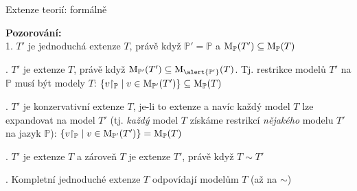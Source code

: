 \documentclass{beamer}
\begin{document}
\begin{frame}{Extenze teorií: formálně}


    \pause
    {\small
    \textbf{Pozorování:}\\
    1. $T'$ je jednoduchá extenze $T$, právě když $\mathbb P'=\mathbb P$ a $\operatorname{M}_\mathbb P(T')\subseteq\operatorname{M}_\mathbb P(T)$

    . $T'$ je extenze $T$, právě když $\M_{\mathbb P'}(T')\subseteq\M_{\alert{\mathbb P'}}(T)$. Tj. \alert{restrikce}
    modelů $T'$ na $\mathbb P$ musí být modely $T$:
    \alert{$
    \{v{\restriction_\mathbb P}\mid v\in\operatorname{M}_{\mathbb P'}(T')\}\subseteq\operatorname{M}_\mathbb P(T)
    $}

    . $T'$ je konzervativní extenze $T$, je-li to extenze a navíc každý model $T$ lze \alert{expandovat} na model $T'$ (tj. \emph{každý} model $T$ získáme restrikcí \emph{nějakého} modelu $T'$ na jazyk $\mathbb P$):
    \alert{$
    \{v{\restriction_\mathbb P}\mid v\in\operatorname{M}_      {\mathbb P'}(T')\}=\operatorname{M}_\mathbb P(T)
    $}

    . $T'$ je extenze $T$ a zároveň $T$ je extenze $T'$, právě když $T\sim T'$     

    . \alert{Kompletní jednoduché extenze} $T$ \alert{odpovídají modelům} $T$ (až na $\sim$)
    }

\end{frame}
\end{document}
